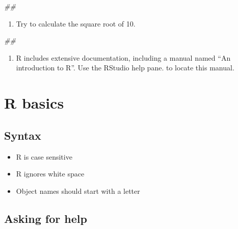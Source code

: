 \documentclass[]{book}
\newenvironment{Shaded}{\begin{snugshade}}{\end{snugshade}}
\newcommand{\CommentTok}[1]{\textcolor[rgb]{0.56,0.35,0.01}{\textit{#1}}}
\providecommand{\tightlist}{%
  \setlength{\itemsep}{0pt}\setlength{\parskip}{0pt}}
\begin{document}
\begin{Shaded}
\begin{Highlighting}[]
\CommentTok{##}
\end{Highlighting}
\end{Shaded}

\begin{enumerate}
\def\labelenumi{\arabic{enumi}.}
\setcounter{enumi}{1}
\tightlist
\item
  Try to calculate the square root of 10.
\end{enumerate}

\begin{Shaded}
\begin{Highlighting}[]
\CommentTok{##}
\end{Highlighting}
\end{Shaded}

\begin{enumerate}
\def\labelenumi{\arabic{enumi}.}
\setcounter{enumi}{2}
\tightlist
\item
  R includes extensive documentation, including a manual named ``An
  introduction to R''. Use the RStudio help pane. to locate this manual.
\end{enumerate}

\hypertarget{r-basics}{%
\section{R basics}\label{r-basics}}

\hypertarget{syntax}{%
\subsection{Syntax}\label{syntax}}

\begin{itemize}
\tightlist
\item
  R is case sensitive
\item
  R ignores white space
\item
  Object names should start with a letter
\end{itemize}

\hypertarget{asking-for-help}{%
\subsection{Asking for help}\label{asking-for-help}}
\end{document}
